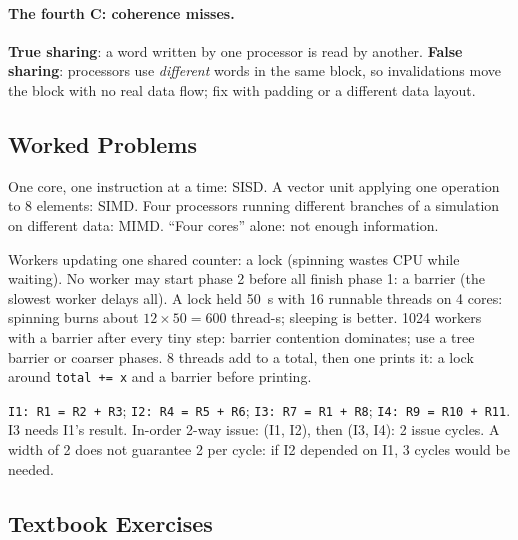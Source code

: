 \paragraph{The fourth C: coherence misses.} \textbf{True sharing}: a word written by
one processor is read by another. \textbf{False sharing}: processors use
\emph{different} words in the same block, so invalidations move the block with no
real data flow; fix with padding or a different data layout.

\subsection{Worked Problems}
\label{sec:mp-problems}

\begin{eg}
One core, one instruction at a time: SISD. A vector unit applying one operation to
8 elements: SIMD. Four processors running different branches of a simulation on
different data: MIMD. ``Four cores'' alone: not enough information.
\end{eg}

\begin{eg}
Workers updating one shared counter: a lock (spinning wastes CPU while waiting).
No worker may start phase 2 before all finish phase 1: a barrier (the slowest worker
delays all). A lock held 50~\textmu s with 16 runnable threads on 4 cores: spinning
burns about $12\times50=600$ thread-\textmu s; sleeping is better. 1024 workers with
a barrier after every tiny step: barrier contention dominates; use a tree barrier or
coarser phases. 8 threads add to a total, then one prints it: a lock around
\texttt{total += x} and a barrier before printing.
\end{eg}

\begin{eg}
\texttt{I1: R1 = R2 + R3}; \texttt{I2: R4 = R5 + R6}; \texttt{I3: R7 = R1 + R8};
\texttt{I4: R9 = R10 + R11}. I3 needs I1's result. In-order 2-way issue:
(I1, I2), then (I3, I4): 2 issue cycles. A width of 2 does not guarantee 2 per cycle:
if I2 depended on I1, 3 cycles would be needed.
\end{eg}

\subsection{Textbook Exercises}
\label{sec:mp-tbx}

